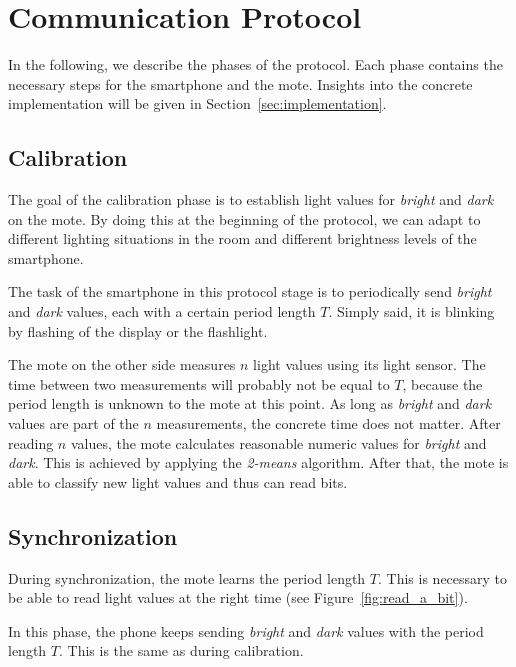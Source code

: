 \documentclass{sig-alternate} %
\begin{document}
\section{Communication Protocol}
\label{sec:communication_protocol}

In the following, we describe the phases of the protocol.
Each phase contains the necessary steps for the smartphone and the mote.
Insights into the concrete implementation will be given in Section~\ref{sec:implementation}.

\subsection{Calibration}
\label{sub:calibration}

The goal of the calibration phase is to establish light values for \textit{bright} and \textit{dark} on the mote.
By doing this at the beginning of the protocol, we can adapt to different lighting situations in the room and different brightness levels of the smartphone.

The task of the smartphone in this protocol stage is to periodically send \textit{bright} and \textit{dark} values, each with a certain period length $T$.
Simply said, it is blinking by flashing of the display or the flashlight.

The mote on the other side measures $n$ light values using its light sensor.
The time between two measurements will probably not be equal to $T$, because the period length is unknown to the mote at this point.
As long as \textit{bright} and \textit{dark} values are part of the $n$ measurements, the concrete time does not matter.
After reading $n$ values, the mote calculates reasonable numeric values for \textit{bright} and \textit{dark}.
This is achieved by applying the \mbox{\textit{2-means}} algorithm.
After that, the mote is able to classify new light values and thus can read bits.

\subsection{Synchronization}
\label{sub:synchronization}

During synchronization, the mote learns the period length $T$.
This is necessary to be able to read light values at the right time (see Figure~\ref{fig:read_a_bit}).

In this phase, the phone keeps sending \textit{bright} and \textit{dark} values with the period length $T$.
This is the same as during calibration.
\end{document}
